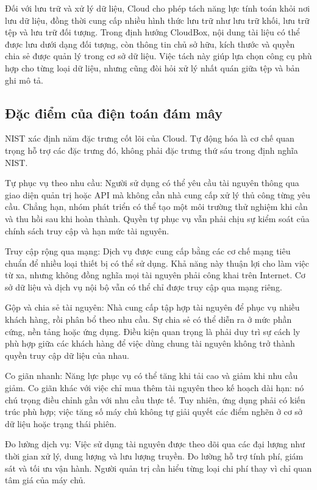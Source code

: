 Đối với lưu trữ và xử lý dữ liệu, Cloud cho phép tách năng lực tính toán khỏi nơi lưu dữ liệu, đồng thời cung cấp nhiều hình thức lưu trữ như lưu trữ khối, lưu trữ tệp và lưu trữ đối tượng. Trong định hướng CloudBox, nội dung tài liệu có thể được lưu dưới dạng đối tượng, còn thông tin chủ sở hữu, kích thước và quyền chia sẻ được quản lý trong cơ sở dữ liệu. Việc tách này giúp lựa chọn công cụ phù hợp cho từng loại dữ liệu, nhưng cũng đòi hỏi xử lý nhất quán giữa tệp và bản ghi mô tả.

\subsection{Đặc điểm của điện toán đám mây}
NIST xác định năm đặc trưng cốt lõi của Cloud. Tự động hóa là cơ chế quan trọng hỗ trợ các đặc trưng đó, không phải đặc trưng thứ sáu trong định nghĩa NIST.\cite{nistcloud}

Tự phục vụ theo nhu cầu: Người sử dụng có thể yêu cầu tài nguyên thông qua giao diện quản trị hoặc API mà không cần nhà cung cấp xử lý thủ công từng yêu cầu. Chẳng hạn, nhóm phát triển có thể tạo một môi trường thử nghiệm khi cần và thu hồi sau khi hoàn thành. Quyền tự phục vụ vẫn phải chịu sự kiểm soát của chính sách truy cập và hạn mức tài nguyên.

Truy cập rộng qua mạng: Dịch vụ được cung cấp bằng các cơ chế mạng tiêu chuẩn để nhiều loại thiết bị có thể sử dụng. Khả năng này thuận lợi cho làm việc từ xa, nhưng không đồng nghĩa mọi tài nguyên phải công khai trên Internet. Cơ sở dữ liệu và dịch vụ nội bộ vẫn có thể chỉ được truy cập qua mạng riêng.

Gộp và chia sẻ tài nguyên: Nhà cung cấp tập hợp tài nguyên để phục vụ nhiều khách hàng, rồi phân bổ theo nhu cầu. Sự chia sẻ có thể diễn ra ở mức phần cứng, nền tảng hoặc ứng dụng. Điều kiện quan trọng là phải duy trì sự cách ly phù hợp giữa các khách hàng để việc dùng chung tài nguyên không trở thành quyền truy cập dữ liệu của nhau.

Co giãn nhanh: Năng lực phục vụ có thể tăng khi tải cao và giảm khi nhu cầu giảm. Co giãn khác với việc chỉ mua thêm tài nguyên theo kế hoạch dài hạn: nó chú trọng điều chỉnh gần với nhu cầu thực tế. Tuy nhiên, ứng dụng phải có kiến trúc phù hợp; việc tăng số máy chủ không tự giải quyết các điểm nghẽn ở cơ sở dữ liệu hoặc trạng thái phiên.

Đo lường dịch vụ: Việc sử dụng tài nguyên được theo dõi qua các đại lượng như thời gian xử lý, dung lượng và lưu lượng truyền. Đo lường hỗ trợ tính phí, giám sát và tối ưu vận hành. Người quản trị cần hiểu từng loại chi phí thay vì chỉ quan tâm giá của máy chủ.


